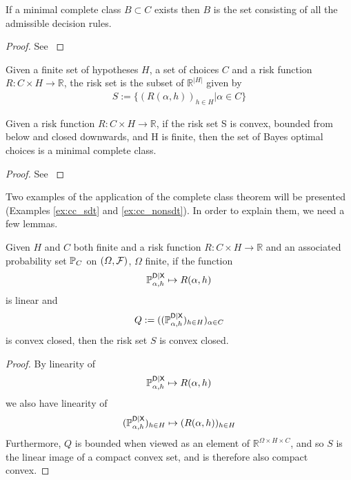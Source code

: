 \begin{theorem}
If a minimal complete class $B\subset C$ exists then $B$ is the set consisting of all the admissible decision rules.
\end{theorem}

\begin{proof}
See \citet[Theorem 2.1]{toutenburg_ferguson_1967}
\end{proof}

\begin{definition}
Given a finite set of hypotheses $H$, a set of choices $C$ and a risk function $R:C\times H\to \mathbb{R}$, the risk set is the subset of $\mathbb{R}^{|H|}$ given by
\begin{align}
    S := \{(R(\alpha,h))_{h\in H}|\alpha\in C\}
\end{align}
\end{definition}

\begin{theorem}
Given a risk function $R:C\times H\to \mathbb{R}$, if the risk set S is convex, bounded from below and closed downwards, and H is finite, then the set of Bayes optimal choices is a minimal complete class.
\end{theorem}

\begin{proof}
See \citet[~Theorem 2.10.2]{toutenburg_ferguson_1967}
\end{proof}

Two examples of the application of the complete class theorem will be presented (Examples \ref{ex:cc_sdt} and \ref{ex:cc_nonsdt}). In order to explain them, we need a few lemmas.

\begin{lemma}\label{lem:convex_closed}
Given $H$ and $C$ both finite and a risk function $R:C\times H\to \mathbb{R}$ and an associated probability set $\mathbb{P}_C$ on $(\Omega,\mathcal{F})$, $\Omega$ finite, if the function
\begin{align}
    \mathbb{P}_{\alpha,h}^{\mathsf{D}|\mathsf{X}}\mapsto R(\alpha,h)
\end{align}
is linear and 
\begin{align}
    Q:= ((\mathbb{P}_{\alpha,h}^{\mathsf{D}|\mathsf{X}})_{h\in H})_{\alpha\in C}
\end{align}
is convex closed, then the risk set $S$ is convex closed.
\end{lemma}

\begin{proof}
By linearity of 
\begin{align}
    \mathbb{P}_{\alpha,h}^{\mathsf{D}|\mathsf{X}}\mapsto R(\alpha,h)
\end{align}
we also have linearity of 
\begin{align}
    (\mathbb{P}_{\alpha,h}^{\mathsf{D}|\mathsf{X}})_{h\in H}\mapsto (R(\alpha,h))_{h\in H}
\end{align}
Furthermore, $Q$ is bounded when viewed as an element of $\mathbb{R}^{\Omega\times H\times C}$, and so $S$ is the linear image of a compact convex set, and is therefore also compact convex.
\end{proof}

